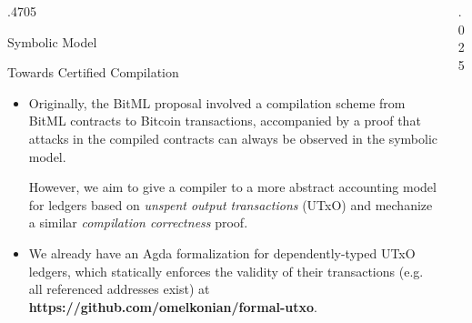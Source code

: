 \documentclass[final,hyperref={pdfpagelabels=false}]{beamer}
\newcommand\sepsize{.025\textwidth}
\newcommand\colsize{.4705\textwidth}
\begin{document}
\begin{frame}[t]
\begin{columns}[t]
\begin{column}{\colsize}
\begin{block}{Symbolic Model}
\begin{itemize}
\end{itemize}
\end{block}


\begin{block}{Towards Certified Compilation}
\begin{itemize}

\item
Originally, the BitML proposal involved a compilation scheme from BitML contracts to Bitcoin transactions,
accompanied by a proof that attacks in the compiled contracts can always be observed in the symbolic model.

However, we aim to give a compiler to a more abstract accounting model for ledgers based on \textit{unspent output transactions} (UTxO)
and mechanize a similar \textit{compilation correctness} proof.

\item
We already have an Agda formalization for dependently-typed UTxO ledgers,
which statically enforces the validity of their transactions (e.g. all referenced addresses exist)
at \textbf{https://github.com/omelkonian/formal-utxo}.

\end{itemize}
\end{block}


\end{column} %

\begin{column}{\sepsize}\end{column} %

\end{columns} %

\end{frame} %
\end{document}
